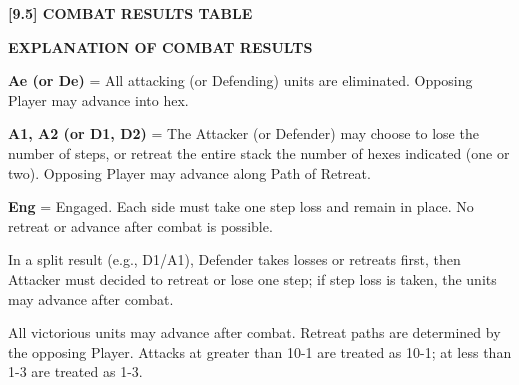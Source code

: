 \par

\textbf{[9.5] COMBAT RESULTS TABLE}

\begin{strip}
\end{strip}

\begin{flushleft}
  \textbf{EXPLANATION OF COMBAT RESULTS}
\end{flushleft}

\textbf{Ae (or De)} = All attacking (or Defending) units are eliminated. Opposing Player may advance into hex.
\par
\textbf{A1, A2 (or D1, D2)} = The Attacker (or Defender) may choose to lose the number of steps, or retreat the entire stack the number of hexes indicated (one or two). Opposing Player may advance along Path of Retreat.
\par
\textbf{Eng} = Engaged. Each side must take one step loss and remain in place. No retreat or advance after combat is possible.
\par
In a split result (e.g., D1/A1), Defender takes losses or retreats first, then Attacker must decided to retreat or lose one step; if step loss is taken, the units may advance after combat.
\par
All victorious units may advance after combat. Retreat paths are determined by the opposing Player. Attacks at greater than 10-1 are treated as 10-1; at less than 1-3 are treated as 1-3.